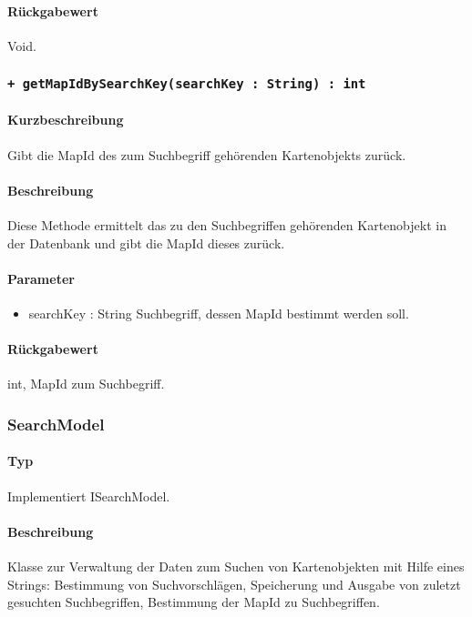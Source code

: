 \paragraph*{Rückgabewert}
Void.

 \subsubsection*{\texttt{+ getMapIdBySearchKey(searchKey : String) : int}}%
\paragraph*{Kurzbeschreibung}
Gibt die MapId des zum Suchbegriff gehörenden Kartenobjekts zurück.
\paragraph*{Beschreibung}
Diese Methode ermittelt das zu den Suchbegriffen gehörenden Kartenobjekt in der Datenbank und gibt die MapId dieses zurück.
\paragraph*{Parameter}
\begin{itemize}
    \item searchKey : String Suchbegriff, dessen MapId bestimmt werden soll.
\end{itemize}
\paragraph*{Rückgabewert}
int, MapId zum Suchbegriff.


\subsubsection{SearchModel}
\paragraph*{Typ}
Implementiert ISearchModel.
\paragraph*{Beschreibung}
Klasse zur Verwaltung der Daten zum Suchen von Kartenobjekten mit Hilfe eines Strings: 
Bestimmung von Suchvorschlägen, Speicherung und Ausgabe von zuletzt gesuchten Suchbegriffen, Bestimmung der MapId zu Suchbegriffen.
